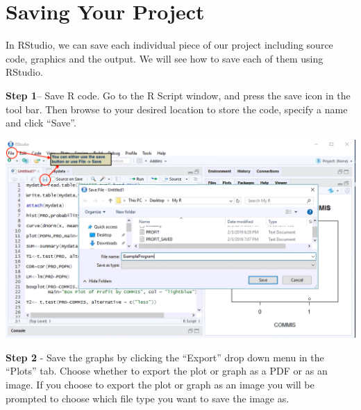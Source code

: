 \documentclass[a4paper]{report}
\begin{document}
        \section{Saving Your Project}
        \begin{flushleft}
            In RStudio, we can save each individual piece of our project including source code, graphics and the output. We will see how to save each of them using RStudio.
            \newline
            
            \textbf{Step 1}– Save R code. Go to the R Script window, and press the save icon in the tool bar. Then browse to your desired location to store the code, specify a name and click ``Save''. 
            
                    \includegraphics[width=\textwidth]{images/SAVE1.png}
            
            
            
            \textbf{Step 2} - Save the graphs by clicking the ``Export'' drop down menu in the ``Plots'' tab. Choose whether to export the plot or graph as a PDF or as an image. If you choose to export the plot or graph as an image you will be prompted to choose which file type you want to save the image as. 
            \newline \newline 
            

\end{flushleft}
\end{document}
